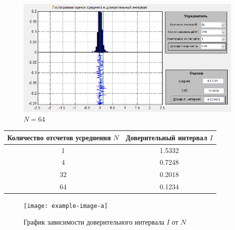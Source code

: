 \begin{figure}[H]
\begin{minipage}{.5\linewidth}
	\caption*{$N = 32$}
	\end{minipage}
	\begin{minipage}{.5\linewidth}
		\centering
        \includegraphics[width=\linewidth]{fig/fig64}
	\caption*{$N = 64$}
	\end{minipage}
\end{figure}
\begin{table}[htbp]
	\centering
	\begin{tabular}{|c|c|}
		\toprule
		\multicolumn{1}{|c|}{\textbf{Количество отсчетов усреднения $N$}} & \textbf{Доверительный интервал $I$} \\
		\midrule
		1     & 1.5332 \\
		\midrule
		4     & 0.7248 \\
		\midrule
		32    & 0.2018 \\
		\midrule
		64    & 0.1234 \\
		\bottomrule
	\end{tabular}%
	\label{tab:addlabel}%
\end{table}%
 \begin{figure}[H]
	\centering
	\texttt{[image: example-image-a]}
	\caption*{График зависимости доверительного интервала $I$ от $N$}
	\end{figure}
